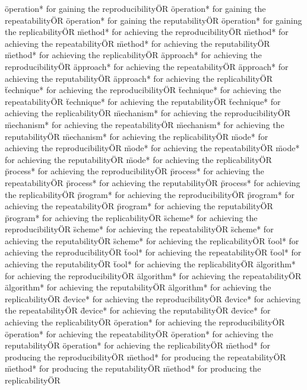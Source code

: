 \documentclass[
10pt, %
a4paper, %
oneside, %
headinclude,footinclude, %
BCOR5mm, %
]{scrartcl}
\begin{document}
\"operation* for gaining the reproducibility\" OR \"operation* for gaining the repeatability\" OR \"operation* for gaining the reputability\" OR \"operation* for gaining the replicability\" OR 
\"method* for achieving the reproducibility\" OR \"method* for achieving the repeatability\" OR \"method* for achieving the reputability\" OR \"method* for achieving the replicability\" OR 
\"approach* for achieving the reproducibility\" OR \"approach* for achieving the repeatability\" OR \"approach* for achieving the reputability\" OR \"approach* for achieving the replicability\" OR 
\"technique* for achieving the reproducibility\" OR \"technique* for achieving the repeatability\" OR \"technique* for achieving the reputability\" OR \"technique* for achieving the replicability\" OR 
\"mechanism* for achieving the reproducibility\" OR \"mechanism* for achieving the repeatability\" OR \"mechanism* for achieving the reputability\" OR \"mechanism* for achieving the replicability\" OR 
\"mode* for achieving the reproducibility\" OR \"mode* for achieving the repeatability\" OR \"mode* for achieving the reputability\" OR \"mode* for achieving the replicability\" OR 
\"process* for achieving the reproducibility\" OR \"process* for achieving the repeatability\" OR \"process* for achieving the reputability\" OR \"process* for achieving the replicability\" OR 
\"program* for achieving the reproducibility\" OR \"program* for achieving the repeatability\" OR \"program* for achieving the reputability\" OR \"program* for achieving the replicability\" OR 
\"scheme* for achieving the reproducibility\" OR \"scheme* for achieving the repeatability\" OR \"scheme* for achieving the reputability\" OR \"scheme* for achieving the replicability\" OR 
\"tool* for achieving the reproducibility\" OR \"tool* for achieving the repeatability\" OR \"tool* for achieving the reputability\" OR \"tool* for achieving the replicability\" OR 
\"algorithm* for achieving the reproducibility\" OR \"algorithm* for achieving the repeatability\" OR \"algorithm* for achieving the reputability\" OR \"algorithm* for achieving the replicability\" OR 
\"device* for achieving the reproducibility\" OR \"device* for achieving the repeatability\" OR \"device* for achieving the reputability\" OR \"device* for achieving the replicability\" OR 
\"operation* for achieving the reproducibility\" OR \"operation* for achieving the repeatability\" OR \"operation* for achieving the reputability\" OR \"operation* for achieving the replicability\" OR 
\"method* for producing the reproducibility\" OR \"method* for producing the repeatability\" OR \"method* for producing the reputability\" OR \"method* for producing the replicability\" OR 
\end{document}
